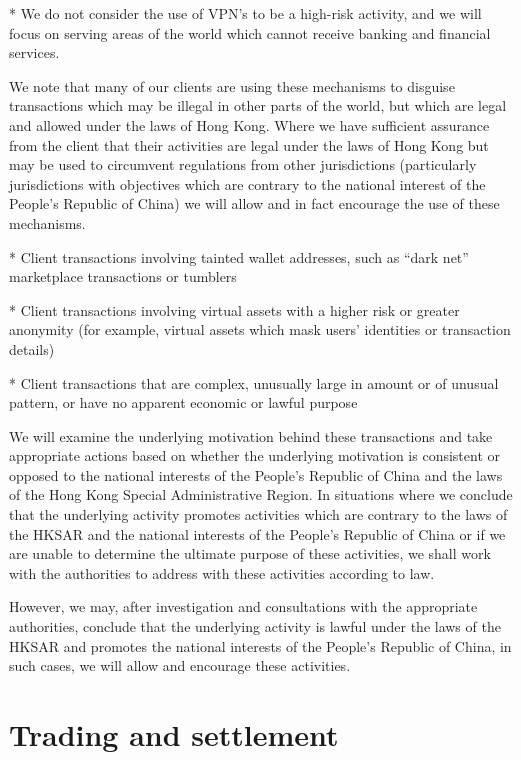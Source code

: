 * We do not consider the use of VPN's to be a high-risk activity,
and we will focus on serving areas of the world which cannot
receive banking and financial services.

We note that many of our clients are using these mechanisms to
disguise transactions which may be illegal in other parts of the
world, but which are legal and allowed under the laws of Hong Kong.
Where we have sufficient assurance from the client that their
activities are legal under the laws of Hong Kong but may be used to
circumvent regulations from other jurisdictions (particularly
jurisdictions with objectives which are contrary to the national
interest of the People's Republic of China) we will allow and in fact
encourage the use of these mechanisms.

* Client transactions involving tainted wallet addresses, such as
“dark net” marketplace transactions or tumblers

* Client transactions involving virtual assets with a higher risk or
greater anonymity (for example, virtual assets which mask users’
identities or transaction details)

* Client transactions that are complex, unusually large in amount or
of unusual pattern, or have no apparent economic or lawful purpose

We will examine the underlying motivation behind these transactions
and take appropriate actions based on whether the underlying
motivation is consistent or opposed to the national interests of the
People's Republic of China and the laws of the Hong Kong Special
Administrative Region.  In situations where we conclude that the
underlying activity promotes activities which are contrary to the laws
of the HKSAR and the national interests of the People's Republic
of China or if we are unable to determine the ultimate purpose of
these activities, we shall work with the authorities to address with
these activities according to law.

However, we may, after investigation and consultations with the appropriate authorities, conclude that the underlying activity is lawful under the
laws of the HKSAR and promotes the national interests of the People's
Republic of China, in such cases, we will allow and encourage these
activities.

\section{Trading and settlement}

